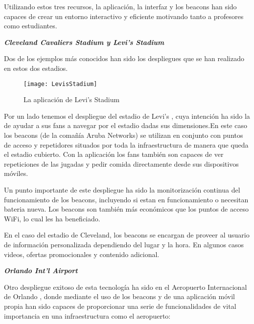 Utilizando estos tres recursos, la aplicación, la interfaz y los beacons han sido capaces de crear un entorno interactivo y eficiente motivando tanto a profesores como estudiantes. 

\vspace{5mm}

\textsl{\textbf{{Cleveland Cavaliers Stadium y Levi's Stadium}}}

\vspace{2mm}

Dos de los ejemplos más conocidos han sido los despliegues que se han realizado en estos dos estadios. 

\begin{figure}[H]
	\centering
	\texttt{[image: LevisStadium]}
	\caption{La aplicación de Levi's Stadium}
	\label{fig:levisStadium}
\end{figure}

Por un lado tenemos el despliegue del estadio de Levi's , cuya intención ha sido la de ayudar a sus fans a navegar por el estadio dadas sus dimensiones.En este caso los beacons (de la comañía Aruba Networks) se utilizan en conjunto con puntos de acceso y repetidores situados por toda la infraestructura de manera que queda el estadio cubierto. Con la aplicación los fans también son capaces de ver repeticiones de las jugadas y pedir comida directamente desde sus dispositivos móviles.


Un punto importante de este  despliegue ha sido la monitorización continua del funcionamiento de los beacons, incluyendo si estan en funcionamiento o necesitan bateria nueva. Los beacons son también más económicos que los puntos de acceso WiFi, lo cual les ha beneficiado.

En el caso del estadio de Cleveland, los beacons se encargan de proveer al usuario de información personalizada dependiendo del lugar y la hora. En algunos casos videos, ofertas promocionales y contenido adicional.

\vspace{5mm}

\textsl{\textbf{{Orlando Int'l Airport}}}

\vspace{2mm}

Otro despliegue exitoso de esta tecnología ha sido en el Aeropuerto Internacional de Orlando , donde mediante el uso de los beacons y de una aplicación móvil propia han sido capaces de proporcionar una serie de funcionalidades de vital importancia en una infraestructura como el aeropuerto: 

